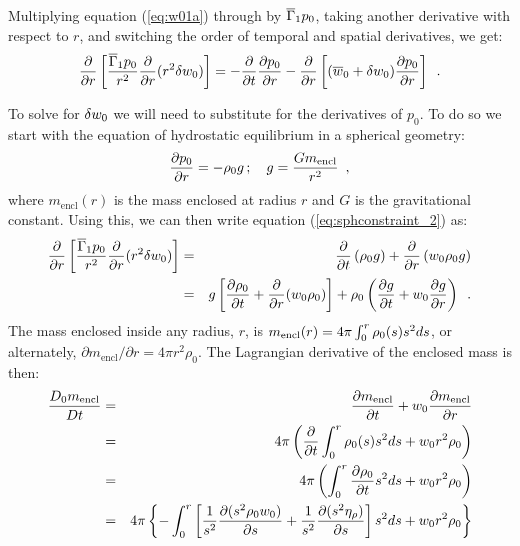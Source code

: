 \begin{enumerate}
\begin{description}
Multiplying equation (\ref{eq:w01a}) through by $\overline{\Gamma}_1 p_0 $,
taking another derivative with respect to $r$, and switching the order
of temporal and spatial derivatives, we get:
\begin{equation}
\label{eq:sphconstraint_2}
\frac{\partial}{\partial r} \left [ \frac{\overline{\Gamma}_1 p_0 }{r^2} \frac{\partial}{\partial r} (r^2 \delta w_0) \right ]
= -\frac{\partial}{\partial t} \frac{\partial p_0}{\partial r}
  -\frac{\partial}{\partial r} \left [(\overline{w}_0+\delta w_0) \frac{\partial p_0}{\partial r} \right ]\enskip.
\end{equation}

To solve for $\delta w_0$ we will need to substitute for the derivatives of $p_0.$
To do so we start with the equation of hydrostatic equilibrium in a spherical geometry:
\begin{equation}
\frac{\partial p_0}{\partial r} = -\rho_0 g \, ; \quad
g = \frac{G m_\mathrm{encl}}{r^2}\enskip,
\end{equation}
where $m_\mathrm{encl}(r)$ is the mass enclosed at radius $r$ and $G$ is the
gravitational constant.  
Using this, we can then write equation (\ref{eq:sphconstraint_2}) as:
\begin{eqnarray}
\frac{\partial}{\partial r} \left[ \frac{\overline{\Gamma}_1 p_0}{r^2} \frac{\partial}{\partial r} (r^2 \delta w_0) \right] &=&
 \frac{\partial}{\partial t} \left (\rho_0 g \right )
+\frac{\partial}{\partial r} \left (w_0 \rho_0 g \right) \nonumber \\
&=&
  g \left[ \frac{\partial \rho_0}{\partial t} + \frac{\partial}{\partial r} (w_0 \rho_0) \right]
+ \rho_0 \left( \frac{\partial g}{\partial t} + w_0 \frac{\partial g}{\partial r} \right) \enskip.
\label{eq:sphconstraint_3}
\end{eqnarray}
The mass enclosed inside any radius, $r$, is $m_\mathrm{encl}(r) = 4 \pi
\int_0^r \rho_0(s) s^2 ds$, or alternately, $\partial m_\mathrm{encl}/\partial r = 4\pi r^2 \rho_0$.  
The Lagrangian derivative of the enclosed mass is then:
\begin{eqnarray}
\frac{D_0 m_\mathrm{encl}}{D t} &=& \frac{\partial m_\mathrm{encl}}{\partial t} + w_0 \frac{\partial m_\mathrm{encl}}{\partial r} \nonumber \\
 &=& 4\pi \left( \frac{\partial}{\partial t} \int_0^r \rhozero(s) s^2 ds + w_0 r^2 \rho_0 \right) \nonumber \\
&=& 4\pi \left( \int_0^r \frac{\partial \rho_0}{\partial t} s^2 ds + w_0 r^2 \rho_0 \right) \nonumber \\
&=& 4\pi \left\{ -\int_0^r \left [ \frac{1}{s^2}\frac{\partial(s^2 \rho_0 w_0)}{\partial s} + \frac{1}{s^2}\frac{\partial (s^2 \etarho)}{\partial s} \right ]s^2 ds + w_0 r^2 \rho_0 \right\} \nonumber \\

\end{eqnarray}
\end{description}
\end{enumerate}
